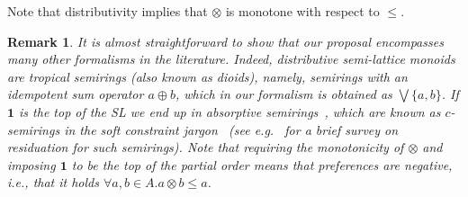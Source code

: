 \documentclass[preprint,12pt]{elsarticle}
\newtheorem{remark}{Remark}
\newtheorem{example}{Example}
\def\monid{{\mathbf 0}}
\def\monop{\otimes}
\def\monid{\mathbf{1}}
\begin{document}
Note that distributivity implies that $\otimes$ is monotone with respect to $\leq$.
\begin{remark}
	
	It is almost straightforward to show that our proposal encompasses many other formalisms in the literature.
	Indeed, distributive semi-lattice monoids are \emph{tropical} semirings (also known as dioids), 
	namely, semirings with an idempotent sum operator $a \oplus b$, which in our formalism is obtained as
	$\bigvee \{a, b\}$.
	If $\monid$ is the top of the SL we end up 
	in \emph{absorptive} semirings~\cite{golanShort}, 
	which are known as $c$-semirings 
	in the soft constraint jargon~\cite{jacm97} (see e.g.~\cite{ecai06} for a brief survey on residuation 
	for such semirings).
	Note that requiring the monotonicity of $\otimes$ and imposing $\monid$ to be the top of the partial order
	means that preferences are negative, i.e., 
	that it holds $\forall a, b \in A. a \monop b \leq a$.
\end{remark}

%
%
%
\end{document}
